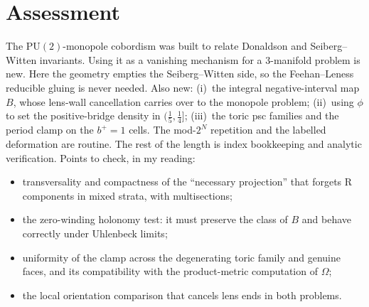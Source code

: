 \documentclass[10pt]{amsart}
\begin{document}
\section*{Assessment}
The $\mathrm{PU}(2)$-monopole cobordism was built to relate Donaldson and
Seiberg--Witten invariants. Using it as a vanishing mechanism for a
$3$-manifold problem is new. Here the geometry empties the Seiberg--Witten
side, so the Feehan--Leness reducible gluing is never needed. Also new:
(i)~the integral negative-interval map $B$, whose lens-wall cancellation
carries over to the monopole problem; (ii)~using $\phi$ to set the
positive-bridge density in $(\frac15,\frac14]$; (iii)~the toric psc families
and the period clamp on the $b^+=1$ cells. The mod-$2^N$ repetition and the
labelled deformation are routine. The rest of the length is index
bookkeeping and analytic verification. Points to check, in my reading:
\begin{itemize}
\item transversality and compactness of the ``necessary projection'' that
forgets R components in mixed strata, with multisections;
\item the zero-winding holonomy test: it must preserve the class of $B$ and
behave correctly under Uhlenbeck limits;
\item uniformity of the clamp across the degenerating toric family and
genuine faces, and its compatibility with the product-metric computation of
$\Omega$;
\item the local orientation comparison that cancels lens ends in both
problems.
\end{itemize}
\end{document}
